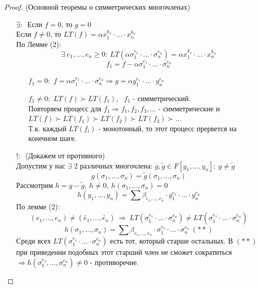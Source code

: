 \documentclass[a4paper, 12pt]{article}
\theoremstyle{definition}
\begin{document}
  \begin{proof} (Основной теоремы о симметрических многочленах) 
    \begin{itemize}
      \item[$\underline{\exists}: \ $] Если $f = 0$, то $g = 0$\\
      Если $f \neq 0$, то $LT(f) = \alpha x_1^{k_1} \cdot ... \cdot x_n^{k_n}$\\
      По Лемме (2): 
      $$\exists \ e_1,...,e_n \geq 0: \ LT(\alpha \sigma_1^{e_1} \cdot ...\cdot \sigma_n^{e_n}) = \alpha x_1^{k_1} \cdot ... \cdot x_n^{k_n}$$
      $$f_1 = f - \alpha \sigma_1^{e_1}\cdot ...\cdot \sigma_n^{e_n}$$
      \begin{itemize}
        \item[$f_1 = 0:$] $f = \alpha \sigma_1^{e_1}\cdot ...\cdot \sigma_n^{e_n} \Longrightarrow g = \alpha y_1^{e_1}\cdot...\cdot y_n^{e_n}$
        \item[$f_1 \neq 0:$] $LT(f) \succ LT(f_1)$, \ $f_1$ - симметрический.\\
        Повторяем процесс для $f_1 \Longrightarrow f_1,f_2,f_3,...$ - симметрические и\\
        $LT(f) \succ LT(f_1) \succ LT(f_2) \succ LT(f_3) \succ ...$\\
        Т.к. каждый $LT(f_i)$ - монотонный, то этот процесс прервется на конечном шаге.   
      \end{itemize}
      \item[$\underline{!}: \ $] (Докажем от противного)\\
      Допустим у нас $\exists$  2 различных многочлена: $g, \widetilde{g} \in F[y_1,...,y_n]: \ g \neq \widetilde{g}$ 
      $$g(\sigma_1,...,\sigma_n) = \widetilde{g}(\sigma_1,...,\sigma_n)$$
      Рассмотрим $h = g - \widetilde{g}, \ h \neq 0, \ h(\sigma_1,...,\sigma_n) = 0$
      $$h(y_1,...,y_n) = \sum \beta_{e_1,...,e_n} \cdot y_1^{e_1} \cdot ... \cdot y_n^{e_n}$$
      По лемме (2):
      $$(e_1,...,e_n) \neq (\widetilde{e_1},...,\widetilde{e_n})\ \Longrightarrow \ LT(\sigma_1^{e_1} \cdot ...\cdot \sigma_n^{e_n}) \neq LT(\sigma_1^{\widetilde{e}_1}\cdot ...\cdot \sigma_n^{\widetilde{e}_n})$$
      $$h(\sigma_1,...,\sigma_n) = \sum \beta_{e_1,...,e_n} \cdot \sigma_1^{e_1} \cdot ... \cdot \sigma_n^{e_n} \ (**)$$
      Среди всех $LT(\sigma_1^{e_1}\cdot ...\cdot \sigma_n^{e_n})$ есть тот, который старше остальных. В $(**)$ при приведении подобных этот старший член не сможет сократиться $\Longrightarrow h(\sigma_1^{e_1},...,\sigma_n^{e_n}) \neq 0$ - противоречие. 
    \end{itemize}
  \end{proof}
\end{document}
